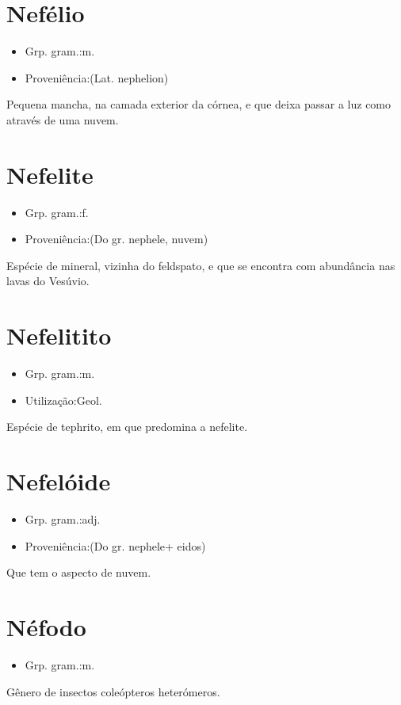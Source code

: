 \section{Nefélio}
\begin{itemize}
\item {Grp. gram.:m.}
\end{itemize}
\begin{itemize}
\item {Proveniência:(Lat. \textunderscore nephelion\textunderscore )}
\end{itemize}
Pequena mancha, na camada exterior da córnea, e que deixa passar a luz como através de uma nuvem.
\section{Nefelite}
\begin{itemize}
\item {Grp. gram.:f.}
\end{itemize}
\begin{itemize}
\item {Proveniência:(Do gr. \textunderscore nephele\textunderscore , nuvem)}
\end{itemize}
Espécie de mineral, vizinha do feldspato, e que se encontra com abundância nas lavas do Vesúvio.
\section{Nefelitito}
\begin{itemize}
\item {Grp. gram.:m.}
\end{itemize}
\begin{itemize}
\item {Utilização:Geol.}
\end{itemize}
Espécie de tephrito, em que predomina a nefelite.
\section{Nefelóide}
\begin{itemize}
\item {Grp. gram.:adj.}
\end{itemize}
\begin{itemize}
\item {Proveniência:(Do gr. \textunderscore nephele\textunderscore  + \textunderscore eidos\textunderscore )}
\end{itemize}
Que tem o aspecto de nuvem.
\section{Néfodo}
\begin{itemize}
\item {Grp. gram.:m.}
\end{itemize}
Gênero de insectos coleópteros heterómeros.
